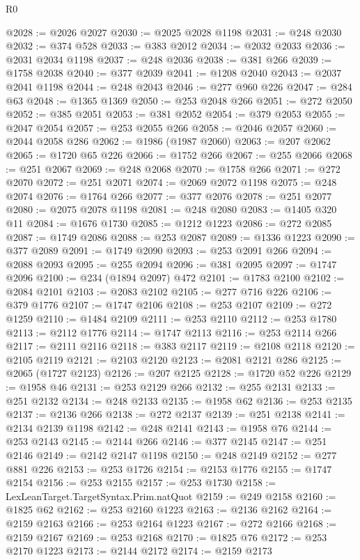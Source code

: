 \begin{lexlean}{R0}
\begin{coremodule}
@2028 := @2026 @2027
@2030 := @2025 @2028 @1198
@2031 := @248 @2030
@2032 := @374 @528
@2033 := @383 @2012
@2034 := @2032 @2033
@2036 := @2031 @2034 @1198
@2037 := @248 @2036
@2038 := @381 @266
@2039 := @1758 @2038
@2040 := @377 @2039
@2041 := @1208 @2040
@2043 := @2037 @2041 @1198
@2044 := @248 @2043
@2046 := @277 @960 @226
@2047 := @284 @63
@2048 := @1365 @1369
@2050 := @253 @2048 @266
@2051 := @272 @2050
@2052 := @385 @2051
@2053 := @381 @2052
@2054 := @379 @2053
@2055 := @2047 @2054
@2057 := @253 @2055 @266
@2058 := @2046 @2057
@2060 := @2044 @2058 @286
@2062 := @1986 (@1987 @2060)
@2063 := @207 @2062
@2065 := @1720 @65 @226
@2066 := @1752 @266
@2067 := @255 @2066
@2068 := @251 @2067
@2069 := @248 @2068
@2070 := @1758 @266
@2071 := @272 @2070
@2072 := @251 @2071
@2074 := @2069 @2072 @1198
@2075 := @248 @2074
@2076 := @1764 @266
@2077 := @377 @2076
@2078 := @251 @2077
@2080 := @2075 @2078 @1198
@2081 := @248 @2080
@2083 := @1405 @320 @11
@2084 := @1676 @1730
@2085 := @1212 @1223
@2086 := @272 @2085
@2087 := @1749 @2086
@2088 := @253 @2087
@2089 := @1336 @1223
@2090 := @377 @2089
@2091 := @1749 @2090
@2093 := @253 @2091 @266
@2094 := @2088 @2093
@2095 := @255 @2094
@2096 := @381 @2095
@2097 := @1747 @2096
@2100 := @234 (@1894 @2097) @472
@2101 := @1783 @2100
@2102 := @2084 @2101
@2103 := @2083 @2102
@2105 := @277 @716 @226
@2106 := @379 @1776
@2107 := @1747 @2106
@2108 := @253 @2107
@2109 := @272 @1259
@2110 := @1484 @2109
@2111 := @253 @2110
@2112 := @253 @1780
@2113 := @2112 @1776
@2114 := @1747 @2113
@2116 := @253 @2114 @266
@2117 := @2111 @2116
@2118 := @383 @2117
@2119 := @2108 @2118
@2120 := @2105 @2119
@2121 := @2103 @2120
@2123 := @2081 @2121 @286
@2125 := @2065 (@1727 @2123)
@2126 := @207 @2125
@2128 := @1720 @52 @226
@2129 := @1958 @46
@2131 := @253 @2129 @266
@2132 := @255 @2131
@2133 := @251 @2132
@2134 := @248 @2133
@2135 := @1958 @62
@2136 := @253 @2135
@2137 := @2136 @266
@2138 := @272 @2137
@2139 := @251 @2138
@2141 := @2134 @2139 @1198
@2142 := @248 @2141
@2143 := @1958 @76
@2144 := @253 @2143
@2145 := @2144 @266
@2146 := @377 @2145
@2147 := @251 @2146
@2149 := @2142 @2147 @1198
@2150 := @248 @2149
@2152 := @277 @881 @226
@2153 := @253 @1726
@2154 := @2153 @1776
@2155 := @1747 @2154
@2156 := @253 @2155
@2157 := @253 @1730
@2158 := LexLeanTarget.TargetSyntax.Prim.natQuot
@2159 := @249 @2158
@2160 := @1825 @62
@2162 := @253 @2160 @1223
@2163 := @2136 @2162
@2164 := @2159 @2163
@2166 := @253 @2164 @1223
@2167 := @272 @2166
@2168 := @2159 @2167
@2169 := @253 @2168
@2170 := @1825 @76
@2172 := @253 @2170 @1223
@2173 := @2144 @2172
@2174 := @2159 @2173

\end{coremodule}
\end{lexlean}
